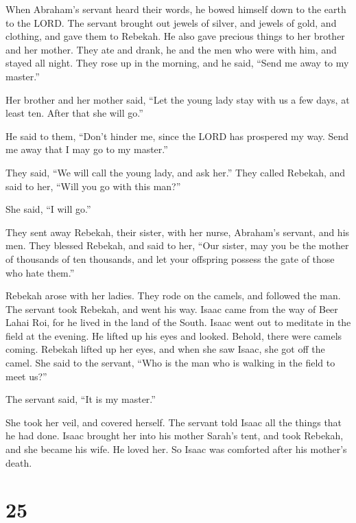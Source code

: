  When Abraham's servant heard their words, he bowed
himself down to the earth to the LORD.  The servant
brought out jewels of silver, and jewels of gold, and clothing, and gave
them to Rebekah. He also gave precious things to her brother and her
mother.  They ate and drank, he and the men who were with
him, and stayed all night. They rose up in the morning, and he said,
``Send me away to my master.''

 Her brother and her mother said, ``Let the young lady
stay with us a few days, at least ten. After that she will go.''

 He said to them, ``Don't hinder me, since the LORD has
prospered my way. Send me away that I may go to my master.''

 They said, ``We will call the young lady, and ask her.''
 They called Rebekah, and said to her, ``Will you go with
this man?''

She said, ``I will go.''

 They sent away Rebekah, their sister, with her nurse,
Abraham's servant, and his men.  They blessed Rebekah,
and said to her, ``Our sister, may you be the mother of thousands of ten
thousands, and let your offspring possess the gate of those who hate
them.''

 Rebekah arose with her ladies. They rode on the camels,
and followed the man. The servant took Rebekah, and went his way.
 Isaac came from the way of Beer Lahai Roi, for he lived
in the land of the South.  Isaac went out to meditate in
the field at the evening. He lifted up his eyes and looked. Behold,
there were camels coming.  Rebekah lifted up her eyes,
and when she saw Isaac, she got off the camel.  She said
to the servant, ``Who is the man who is walking in the field to meet
us?''

The servant said, ``It is my master.''

She took her veil, and covered herself.  The servant told
Isaac all the things that he had done.  Isaac brought her
into his mother Sarah's tent, and took Rebekah, and she became his wife.
He loved her. So Isaac was comforted after his mother's death.

\hypertarget{section-24}{%
\section{25}\label{section-24}}

